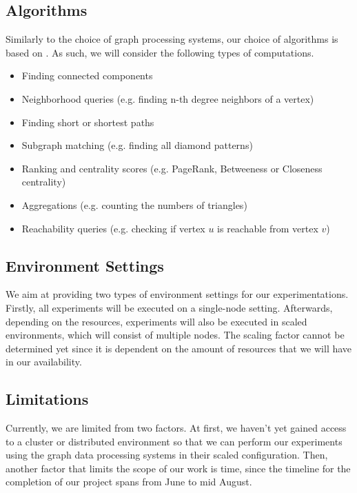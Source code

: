\documentclass[a4paper,11pt]{article}
\begin{document}
\subsection{Algorithms} \label{algos}

\par Similarly to the choice of graph processing systems, our choice of algorithms is based on  \cite{survey}. As such, we will consider the following types of computations.

\begin{itemize}
	\item Finding connected components
	\item Neighborhood queries (e.g. finding n-th degree neighbors of a vertex)
	\item Finding short or shortest paths
	\item Subgraph matching (e.g. finding all diamond patterns)
	\item Ranking and centrality scores (e.g. PageRank, Betweeness or Closeness centrality)
	\item Aggregations (e.g. counting the numbers of triangles)
	\item Reachability queries (e.g. checking if vertex $u$ is reachable from vertex $v$)
\end{itemize}

\subsection{Environment Settings}

\par We aim at providing two types of environment settings for our experimentations. Firstly, all experiments will be executed on a single-node setting. Afterwards, depending on the resources, experiments will also be executed in scaled environments, which will consist of multiple nodes. The scaling factor cannot be determined yet since it is dependent on the amount of resources that we will have in our availability.

\subsection{Limitations} \label{limitations}

Currently, we are limited from two factors. At first, we haven't yet gained access to a cluster or distributed environment so that we can perform our experiments using the graph data processing systems in their scaled configuration. Then, another factor that limits the scope of our work is time, since the timeline for the completion of our project spans from June to mid August.
\end{document}
